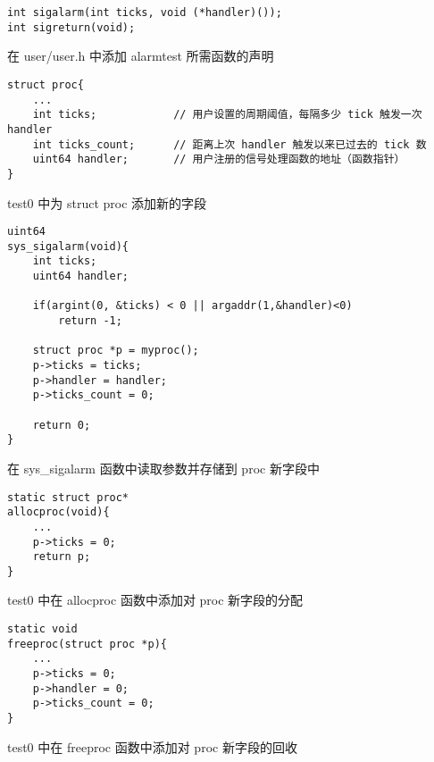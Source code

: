 \begin{listing}[!htb]
	\begin{verbatim}
int sigalarm(int ticks, void (*handler)());
int sigreturn(void);
	\end{verbatim}
	\caption{在 user/user.h 中添加 alarmtest 所需函数的声明}\label{lst:alarmtest}
\end{listing}

\begin{listing}[!htb]
	\begin{verbatim}
struct proc{
    ...
    int ticks;            // 用户设置的周期阈值，每隔多少 tick 触发一次 handler
    int ticks_count;      // 距离上次 handler 触发以来已过去的 tick 数
    uint64 handler;       // 用户注册的信号处理函数的地址（函数指针）
}
	\end{verbatim}
	\caption{test0 中为 struct proc 添加新的字段}\label{lst:add_variables_for_proc_test0}
\end{listing}

\begin{listing}[!htb]
	\begin{verbatim}
uint64
sys_sigalarm(void){
    int ticks;
    uint64 handler;
    
    if(argint(0, &ticks) < 0 || argaddr(1,&handler)<0)
        return -1;
    
    struct proc *p = myproc();
    p->ticks = ticks;
    p->handler = handler;
    p->ticks_count = 0;
    
    return 0;
}
	\end{verbatim}
	\caption{在 sys\_sigalarm 函数中读取参数并存储到 proc 新字段中}\label{lst:read_and_write_param}
\end{listing}

\begin{listing}[!htb]
	\begin{verbatim}
static struct proc*
allocproc(void){
    ...
    p->ticks = 0;
    return p;
}
	\end{verbatim}
	\caption{test0 中在 allocproc 函数中添加对 proc 新字段的分配}\label{lst:add_alloc_in_allocproc_test0}
\end{listing}

\begin{listing}[!htb]
	\begin{verbatim}
static void
freeproc(struct proc *p){
    ...
    p->ticks = 0;
    p->handler = 0;
    p->ticks_count = 0;
}
	\end{verbatim}
	\caption{test0 中在 freeproc 函数中添加对 proc 新字段的回收}\label{lst:add_free_in_freeproc_test0}
\end{listing}


